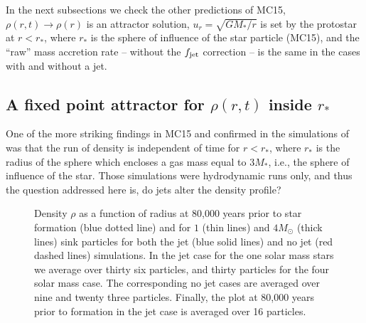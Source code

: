 \documentclass[../dissertation.tex]{subfiles}
\begin{document}
In the next subsections we check the other predictions of MC15, $\rho(r,t) \rightarrow \rho(r)$ is an attractor solution, $u_r = \sqrt{GM_* /r}$ is set by the protostar at $r<r_*$, where $r_*$ is the sphere of influence of the star particle (MC15), and the ``raw'' mass accretion rate -- without the $f_{\rm jet}$ correction --  is the same in the cases with and without a jet.

\subsection{A fixed point attractor for $\rho(r,t)$ inside $r_*$} \label{sec:jet_run_density}

One of the more striking findings in MC15 and confirmed in the simulations of \citet{2017MNRAS.465.1316M} was that the run of density is independent of time for $r < r_*$, where $r_*$ is the radius of the sphere which encloses a gas mass equal to $3 M_*$, i.e., the sphere of influence of the star.
Those simulations were hydrodynamic runs only, and thus the question addressed here is, do jets alter the density profile?
%
\begin{figure}[htb] %
  \caption[Jet - Density profile for Jet Feedback]{Density $\rho$ as a function of radius at 80,000 years prior to star formation (blue dotted line) and for $1$ (thin lines) and $4 M_\odot$ (thick lines) sink particles for both the jet (blue solid lines) and no jet (red dashed lines) simulations. In the jet case for the one solar mass stars we average over thirty six particles, and thirty particles for the four solar mass case. The corresponding no jet cases are averaged over nine and twenty three particles. Finally, the plot at 80,000 years prior to formation in the jet case is averaged over 16 particles.
    }
    \label{fig:jet_ideal_density}
\end{figure}
%
\end{document}
